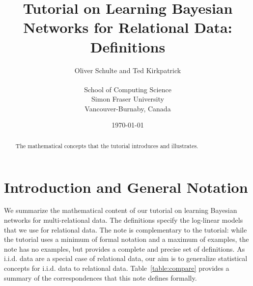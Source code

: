 \documentclass{article}
\begin{document}
\title{Tutorial on Learning Bayesian Networks for Relational Data: Definitions}
\author{Oliver Schulte and Ted Kirkpatrick\\
\\ School of Computing Science\\ Simon Fraser University\\Vancouver-Burnaby, Canada}
\date{\today}
\maketitle

\begin{abstract}
The mathematical concepts that the tutorial  introduces and illustrates.
\end{abstract}

\listoftodos

\section{Introduction and General Notation}
We summarize the mathematical content of our tutorial on learning Bayesian networks for multi-relational data. The definitions specify the log-linear models that we use for relational data. The note is complementary to the tutorial: while the tutorial uses a minimum of formal notation and a maximum of examples, the note has no examples, but provides a complete and precise set of definitions. As i.i.d. data are a special case of relational data, our aim is to generalize statistical concepts for i.i.d. data to relational data. Table~\ref{table:compare} provides a summary of the correspondences that this note defines formally. 

\begin{table}[htp]
\centering
\caption{Statistical concepts for relational vs. i.i.d. data. With a single population and unary functors only, the relational concepts reduce to the i.i.d. concepts.}
\label{table:compare}
\end{table}%
\end{document}
